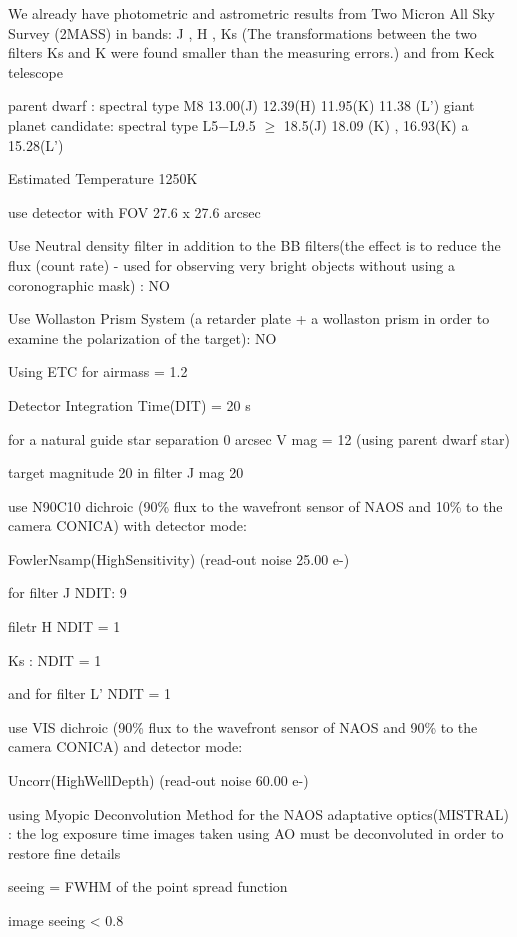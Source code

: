 \documentclass[12pt,a4paper]{article}  %
\begin{document}
We already have photometric and astrometric results  from Two Micron All Sky Survey (2MASS) in bands: J , H , Ks (The transformations between the two filters Ks and K were found smaller than the measuring errors.) and from Keck telescope 

parent dwarf : spectral type M8  13.00(J) 12.39(H) 11.95(K) 11.38 (L') 
giant planet candidate: spectral type L5−L9.5 $\ge$ 18.5(J)  18.09 (K) , 16.93(K) a 15.28(L') 


Estimated Temperature 1250K 




use detector with FOV 27.6 x 27.6 arcsec

Use Neutral density filter in addition to the BB filters(the effect is to reduce the flux (count rate) - used for observing very bright objects without using a coronographic mask) : NO

Use Wollaston Prism System (a retarder plate + a wollaston prism in order to examine the polarization of the target): NO



Using ETC for airmass = 1.2 

Detector Integration Time(DIT) = 20 s

for a natural guide star separation 0 arcsec  V mag = 12  (using parent dwarf star)

target magnitude 20 in filter J mag 20  

use N90C10 dichroic (90\% flux to the wavefront sensor  of NAOS and 10\% to the camera CONICA) with detector mode:

FowlerNsamp(HighSensitivity) (read-out noise 25.00 e-)

for filter J   NDIT: 9  

filetr H NDIT = 1

Ks : NDIT = 1

and  for filter L' NDIT = 1 

use VIS dichroic (90\% flux to the wavefront sensor  of NAOS and 90\% to the camera CONICA) and  detector mode:

Uncorr(HighWellDepth) (read-out noise 60.00 e-)



using Myopic Deconvolution Method for the NAOS adaptative optics(MISTRAL) : the log exposure time images taken using AO must be deconvoluted in order to restore fine details

seeing = FWHM of the point spread function 

image seeing < 0.8
\end{document}
